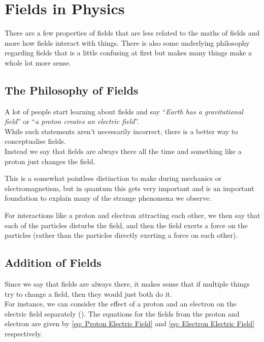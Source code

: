 \documentclass[main.tex]{subfiles}
\begin{document}
        \newpage
        \section{Fields in Physics}
            \label{sec: Fields in Physics}

            There are a few properties of fields that are less related to the maths of fields and more how fields interact with things. There is also some underlying philosophy regarding fields that is a little confusing at first but makes many things make a whole lot more sense.

            
            \subsection{The Philosophy of Fields}
                \label{subsec: The Philosophy of Fields}

                A lot of people start learning about fields and say ``\textit{Earth has a gravitational field}'' or ``\textit{a proton creates an electric field}''.\\
                While such statements aren't necessarily incorrect, there is a better way to conceptualise fields.\\
                Instead we say that fields are always there all the time and something like a proton just changes the field.

                This is a somewhat pointless distinction to make during mechanics or electromagnetism, but in quantum this gets very important and is an important foundation to explain many of the strange phenomena we observe.

                For interactions like a proton and electron attracting each other, we then say that each of the particles disturbs the field, and then the field exerts a force on the particles (rather than the particles directly exerting a force on each other).

            
            \subsection{Addition of Fields}
                \label{subsec: Combination of Fields}

                Since we say that fields are always there, it makes sense that if multiple things try to change a field, then they would just both do it.\\
                For instance, we can consider the effect of a proton and an electron on the electric field separately ().
                The equations for the fields from the proton and electron are given by \eqref{eq: Proton Electric Field} and \eqref{eq: Electron Electric Field} respectively.
\end{document}
